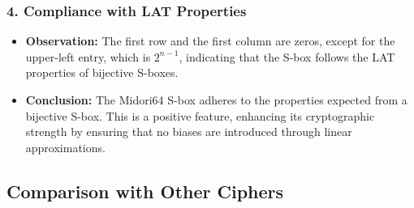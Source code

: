 \subsubsection*{4. Compliance with LAT Properties}
\begin{itemize}
	\item \textbf{Observation:} The first row and the first column are zeros,
	      except for the upper-left entry, which is $2^{n-1}$, indicating that the
	      S-box follows the LAT properties of bijective S-boxes.
	\item \textbf{Conclusion:} The Midori64 S-box adheres to the properties
	      expected from a bijective S-box. This is a positive feature, enhancing its
	      cryptographic strength by ensuring that no biases are introduced through
	      linear approximations.
\end{itemize}


\subsection*{Comparison with Other Ciphers}

